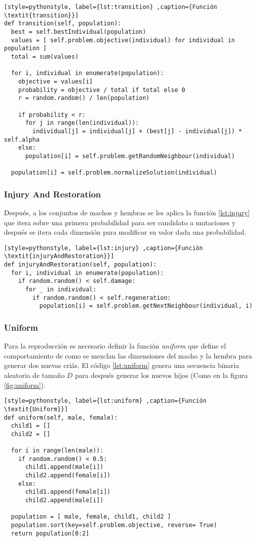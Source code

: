 \begin{lstlisting}[style=pythonstyle, label={lst:transition} ,caption={Función \textit{transition}}]
def transition(self, population):
  best = self.bestIndividual(population)
  values = [ self.problem.objective(individual) for individual in population ]
  total = sum(values)

  for i, individual in enumerate(population):
	objective = values[i]
	probability = objective / total if total else 0
	r = random.random() / len(population)

  	if probability < r:
	  for j in range(len(individual)):
		individual[j] = individual[j] + (best[j] - individual[j]) * self.alpha
	else:
	  population[i] = self.problem.getRandomNeighbour(individual)

  population[i] = self.problem.normalizeSolution(individual)
\end{lstlisting}

\subsubsection{Injury And Restoration}

Después, a los conjuntos de machos y hembras se les aplica la función \ref{lst:injury} que itera sobre una primera probabilidad para ser candidato a mutaciones y después se itera cada dimensión para modificar su valor dada una probabilidad.

\begin{lstlisting}[style=pythonstyle, label={lst:injury} ,caption={Función \textit{injuryAndRestoration}}]
def injuryAndRestoration(self, population):
  for i, individual in enumerate(population):
	if random.random() < self.damage:
	  for _ in individual:
		if random.random() < self.regeneration:
		  population[i] = self.problem.getNextNeighbour(individual, i)
\end{lstlisting}

\subsubsection{Uniform}

Para la reproducción es necesario definir la función \textit{uniform} que define el comportamiento de como se mezclan las dimensiones del macho y la hembra para generar dos nuevas criás. El código \ref{lst:uniform} genera una secuencia binaria aleatoria de tamaño $D$ para después generar los nuevos hijos (Como en la figura \ref{fig:uniform}).

\begin{lstlisting}[style=pythonstyle, label={lst:uniform} ,caption={Función \textit{Uniform}}]
def uniform(self, male, female):
  child1 = []
  child2 = []

  for i in range(len(male)):
	if random.random() < 0.5:
	  child1.append(male[i])
	  child2.append(female[i])
	else:
	  child1.append(female[i])
	  child2.append(male[i])

  population = [ male, female, child1, child2 ]
  population.sort(key=self.problem.objective, reverse= True)         
  return population[0:2]
\end{lstlisting}

